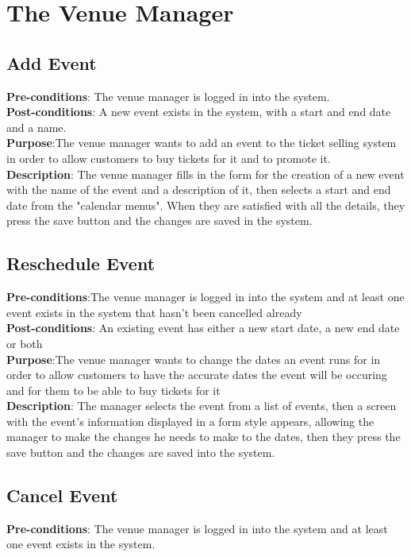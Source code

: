 \section{The Venue Manager}

\subsection{Add Event}
\textbf{Pre-conditions}: The venue manager is logged in into the system.\\

\textbf{Post-conditions}: A new event exists in the system, with a start
and end date and a name.\\

\textbf{Purpose}:The venue manager wants to add an event to the ticket
selling system in order to allow customers to buy tickets for it and
to promote it.\\

\textbf{Description}: The venue manager fills in the form for the creation
of a new event with the name of the event and a description of it, then
selects a start and end date from the "calendar menus". When they are
satisfied with all the details, they press the save button and the
changes are saved in the system.

\subsection{Reschedule Event}
\textbf{Pre-conditions}:The venue manager is logged in into the system
and at least one event exists in the system that hasn't been cancelled
already\\

\textbf{Post-conditions}: An existing event has either a new start date,
a new end date or both\\

\textbf{Purpose}:The venue manager wants to change the dates an event
runs for in order to allow customers to have the accurate dates the
event will be occuring and for them to be able to buy tickets for it\\

\textbf{Description}:
The manager selects the event from a list of events, then a screen with
the event's information displayed in a form style appears, allowing the
manager to  make the changes he needs to make to the dates, then they
press the save button and the changes are saved into the system.

\subsection{Cancel Event}
\textbf{Pre-conditions}: The venue manager is logged in into the system and
at least one event exists in the system.\\

